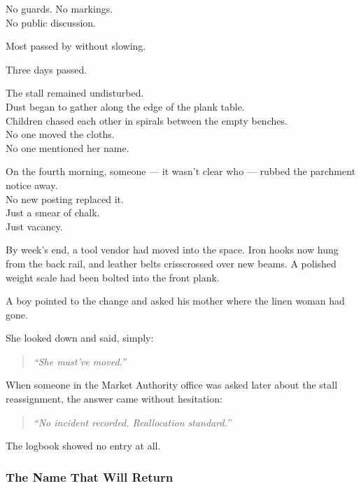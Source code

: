 \documentclass[12pt]{article}
\begin{document}
No guards. No markings.\\
No public discussion.

Most passed by without slowing.

\vspace{1em}

Three days passed.

The stall remained undisturbed.\\
Dust began to gather along the edge of the plank table.\\
Children chased each other in spirals between the empty benches.\\
No one moved the cloths.\\
No one mentioned her name.

On the fourth morning, someone --- it wasn’t clear who --- rubbed the parchment notice away.\\
No new posting replaced it.\\
Just a smear of chalk.\\
Just vacancy.

\vspace{1em}

By week’s end, a tool vendor had moved into the space. Iron hooks now hung from the back rail, and leather belts crisscrossed over new beams. A polished weight scale had been bolted into the front plank.

A boy pointed to the change and asked his mother where the linen woman had gone.

She looked down and said, simply:

\begin{quote}
\textit{“She must’ve moved.”}
\end{quote}

\vspace{1em}

When someone in the Market Authority office was asked later about the stall reassignment, the answer came without hesitation:

\begin{quote}
\textit{“No incident recorded. Reallocation standard.”}
\end{quote}

The logbook showed no entry at all.

\dotfill

\subsubsection*{The Name That Will Return}
\end{document}
